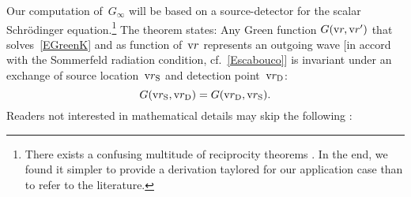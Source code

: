 %
%

Our computation of~$G_\infty$ will be based on a source-detector 
for the scalar Schrödinger equation.\footnote
{There exists a confusing multitude of reciprocity theorems \cite{Pot04}.
In the end, we found it simpler to provide a derivation taylored for our application case
than to refer to the literature.}
The theorem states:
Any Green function $G(\text{v}{r},\text{v}{r}')$
that solves~\cref{EGreenK} and as function of~$\text{v}{r}$ represents an outgoing wave
[in accord with the Sommerfeld radiation condition,
%
%
cf.~\cref{Escabouco}]
is invariant under an exchange of source location~$\text{v}{r}_\text{S}$ and detection point~$\text{v}{r}_\text{D}$:
%
%
\begin{equation}\label{Erecip}
  G(\text{v}{r}_\text{S},\text{v}{r}_\text{D}) = G(\text{v}{r}_\text{D},\text{v}{r}_\text{S}).
\end{equation}
Readers not interested in mathematical details may skip the following :

